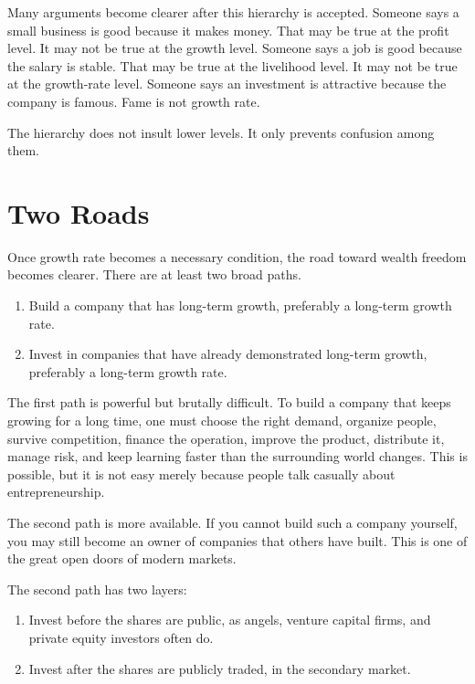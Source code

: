 Many arguments become clearer after this hierarchy is accepted. Someone says a small business is good because it makes money. That may be true at the profit level. It may not be true at the growth level. Someone says a job is good because the salary is stable. That may be true at the livelihood level. It may not be true at the growth-rate level. Someone says an investment is attractive because the company is famous. Fame is not growth rate.

The hierarchy does not insult lower levels. It only prevents confusion among them.

\section*{Two Roads}

Once growth rate becomes a necessary condition, the road toward wealth freedom becomes clearer. There are at least two broad paths.

\begin{enumerate}
\item Build a company that has long-term growth, preferably a long-term growth rate.
\item Invest in companies that have already demonstrated long-term growth, preferably a long-term growth rate.
\end{enumerate}

The first path is powerful but brutally difficult. To build a company that keeps growing for a long time, one must choose the right demand, organize people, survive competition, finance the operation, improve the product, distribute it, manage risk, and keep learning faster than the surrounding world changes. This is possible, but it is not easy merely because people talk casually about entrepreneurship.

The second path is more available. If you cannot build such a company yourself, you may still become an owner of companies that others have built. This is one of the great open doors of modern markets.

The second path has two layers:

\begin{enumerate}
\item Invest before the shares are public, as angels, venture capital firms, and private equity investors often do.
\item Invest after the shares are publicly traded, in the secondary market.
\end{enumerate}

